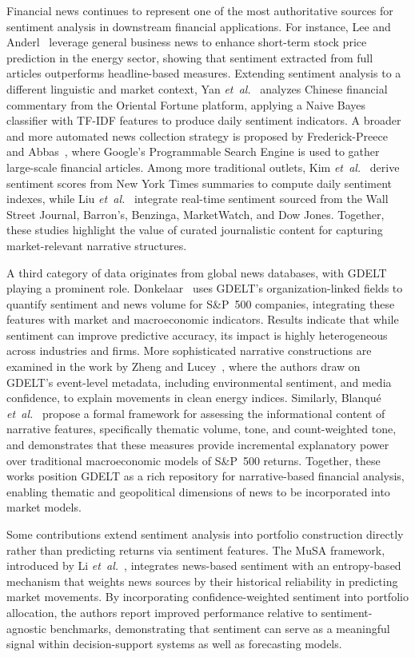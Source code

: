 Financial news continues to represent one of the most authoritative sources for sentiment analysis in downstream financial applications.
For instance, Lee and Anderl~\cite{93d76} leverage general business news to enhance short-term stock price prediction in the energy sector, showing that sentiment extracted from full articles outperforms headline-based measures.
Extending sentiment analysis to a different linguistic and market context, Yan \emph{et~al.}~\cite{9c443} analyzes Chinese financial commentary from the Oriental Fortune platform, applying a Naive Bayes classifier with TF-IDF features to produce daily sentiment indicators.
A broader and more automated news collection strategy is proposed by Frederick-Preece and Abbas~\cite{2b4c0}, where Google's Programmable Search Engine is used to gather large-scale financial articles.
Among more traditional outlets, Kim \emph{et~al.}~\cite{339f6} derive sentiment scores from New York Times summaries to compute daily sentiment indexes, while Liu \emph{et~al.}~\cite{2a15b} integrate real-time sentiment sourced from the Wall Street Journal, Barron's, Benzinga, MarketWatch, and Dow Jones. Together, these studies highlight the value of curated journalistic content for capturing market-relevant narrative structures.

A third category of data originates from global news databases, with GDELT playing a prominent role.
Donkelaar~\cite{286a4} uses GDELT's organization-linked fields to quantify sentiment and news volume for S\&P~500 companies, integrating these features with market and macroeconomic indicators. Results indicate that while sentiment can improve predictive accuracy, its impact is highly heterogeneous across industries and firms.
More sophisticated narrative constructions are examined in the work by Zheng and Lucey~\cite{4e6ff}, where the authors draw on GDELT's event-level metadata, including environmental sentiment, and media confidence, to explain movements in clean energy indices.
Similarly, Blanqué \emph{et~al.}~\cite{0f204} propose a formal framework for assessing the informational content of narrative features, specifically thematic volume, tone, and count-weighted tone, and demonstrates that these measures provide incremental explanatory power over traditional macroeconomic models of S\&P~500 returns.
Together, these works position GDELT as a rich repository for narrative-based financial analysis, enabling thematic and geopolitical dimensions of news to be incorporated into market models.

Some contributions extend sentiment analysis into portfolio construction directly rather than predicting returns via sentiment features. The MuSA framework, introduced by Li \emph{et~al.}~\cite{de270}, integrates news-based sentiment with an entropy-based mechanism that weights news sources by their historical reliability in predicting market movements. By incorporating confidence-weighted sentiment into portfolio allocation, the authors report improved performance relative to sentiment-agnostic benchmarks, demonstrating that sentiment can serve as a meaningful signal within decision-support systems as well as forecasting models.

